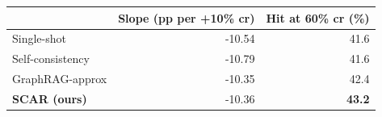 \begin{tabular}{lrr}
\toprule
 & Slope (pp per +10\% cr) & Hit at 60\% cr (\%) \\
\midrule
Single-shot & -10.54 & 41.6 \\
Self-consistency & -10.79 & 41.6 \\
GraphRAG-approx & -10.35 & 42.4 \\
\textbf{SCAR (ours)} & -10.36 & \textbf{43.2} \\
\bottomrule
\end{tabular}